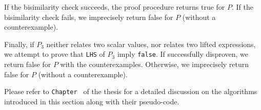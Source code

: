 If the bisimilarity check succeeds, the proof procedure returns
true for $P$.
If the bisimilarity check fails,
we imprecisely return false for $P$ (without a counterexample).

Finally, if $P_3$ neither
relates two scalar values, nor relates two lifted expressions,
we attempt to prove that {\tt LHS} of $P_3$ imply {\tt false}.
If successfully disproven, we return false for $P$ with the counterexamples.
Otherwise, we imprecisely return false for $P$ (without a counterexample).

Please refer to {\tt Chapter \ThesisChapterAlgo{}} of the thesis for a
detailed discussion on the algorithms introduced in this section along
with their pseudo-code.